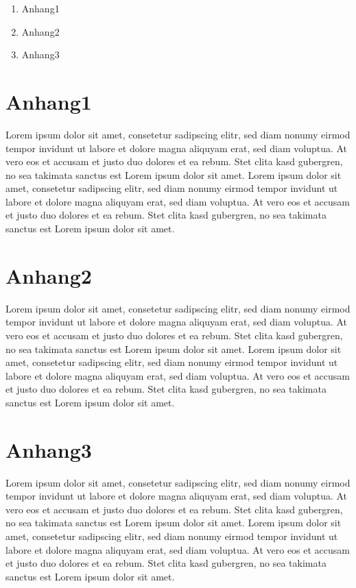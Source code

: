 
\addchap{\appendixPhrase}

{\Large
    \begin{enumerate}[label=\Alph*.]
        \item Anhang1
        \item Anhang2
        \item Anhang3

    \end{enumerate}
}
\pagebreak
\pagebreak

\section{Anhang1}\label{sec:anhang1}
Lorem ipsum dolor sit amet, consetetur sadipscing elitr,
sed diam nonumy eirmod tempor invidunt ut labore et dolore magna aliquyam erat, sed diam voluptua.
At vero eos et accusam et justo duo dolores et ea rebum.
Stet clita kasd gubergren, no sea takimata sanctus est Lorem ipsum dolor sit amet.
Lorem ipsum dolor sit amet, consetetur sadipscing elitr, sed diam nonumy eirmod tempor invidunt
ut labore et dolore magna aliquyam erat, sed diam voluptua.
At vero eos et accusam et justo duo dolores et ea rebum.
Stet clita kasd gubergren,
no sea takimata sanctus est Lorem ipsum dolor sit amet.

\section{Anhang2}\label{sec:anhang2}
Lorem ipsum dolor sit amet, consetetur sadipscing elitr,
sed diam nonumy eirmod tempor invidunt ut labore et dolore magna aliquyam erat, sed diam voluptua.
At vero eos et accusam et justo duo dolores et ea rebum.
Stet clita kasd gubergren, no sea takimata sanctus est Lorem ipsum dolor sit amet.
Lorem ipsum dolor sit amet, consetetur sadipscing elitr, sed diam nonumy eirmod tempor invidunt
ut labore et dolore magna aliquyam erat, sed diam voluptua.
At vero eos et accusam et justo duo dolores et ea rebum.
Stet clita kasd gubergren,
no sea takimata sanctus est Lorem ipsum dolor sit amet.

\section{Anhang3}\label{sec:anhang3}
Lorem ipsum dolor sit amet, consetetur sadipscing elitr,
sed diam nonumy eirmod tempor invidunt ut labore et dolore magna aliquyam erat, sed diam voluptua.
At vero eos et accusam et justo duo dolores et ea rebum.
Stet clita kasd gubergren, no sea takimata sanctus est Lorem ipsum dolor sit amet.
Lorem ipsum dolor sit amet, consetetur sadipscing elitr, sed diam nonumy eirmod tempor invidunt
ut labore et dolore magna aliquyam erat, sed diam voluptua.
At vero eos et accusam et justo duo dolores et ea rebum.
Stet clita kasd gubergren,
no sea takimata sanctus est Lorem ipsum dolor sit amet.